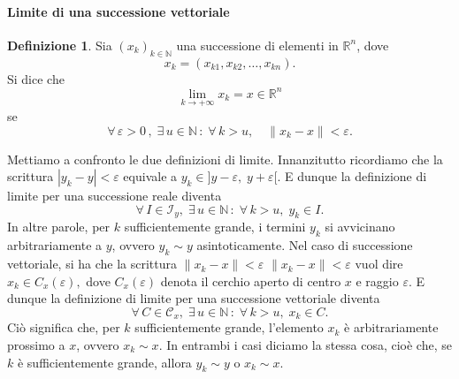 \documentclass{article}
\theoremstyle{plain}
\theoremstyle{definition}
\newtheorem{defn}{Definizione}[section]
\theoremstyle{remark}
\begin{document}
\vspace{10pt}

\paragraph{Limite di una successione vettoriale}
\begin{bxthm}
\begin{defn}
    Sia $(x_k)_{k\in\mathbb{N}}$ una successione di elementi in $\mathbb{R}^n$, dove 
    \[x_k=(x_{k1}, x_{k2}, \dots, x_{kn}). \]
    Si dice che 
    \[\lim_{k\to+\infty} x_k = x \in \mathbb{R}^n\]
    se
    \[\forall\,\varepsilon>0\,,\; \exists\, u\in\mathbb{N}\,:\;\forall\, k>u,\quad \|x_k-x\|<\varepsilon.\]
\end{defn}
\end{bxthm}

\vspace{10pt}

Mettiamo a confronto le due definizioni di limite. Innanzitutto ricordiamo che la scrittura $|y_k - y| < \varepsilon$ equivale a $y_k \in ] y - \varepsilon,\; y + \varepsilon[$.
E dunque la definizione di limite per una successione reale diventa
\[
\forall\,I\in\mathcal{I}_y,\; \exists\, u\in\mathbb{N}\,:\; \forall\, k>u,\; y_k\in I.
\]
In altre parole, per $k$ sufficientemente grande, i termini $y_k$ si avvicinano arbitrariamente a $y$, ovvero $y_k \sim y$ asintoticamente.
Nel caso di successione vettoriale, si ha che la scrittura $\| x_k - x \| < \varepsilon$  $\| x_k - x \| < \varepsilon$ vuol dire $x_k \in C_{x}(\varepsilon),$
dove $C_{x}(\varepsilon)$ denota il cerchio aperto di centro $x$ e raggio $\varepsilon$. E dunque la definizione di limite per una successione vettoriale diventa
\[
\forall\, C\in\mathcal{C}_x,\; \exists\, u\in\mathbb{N}\,:\; \forall\, k>u,\; x_k\in C.
\]
Ciò significa che, per $k$ sufficientemente grande, l'elemento $x_k$ è arbitrariamente prossimo a $x$, ovvero $x_k \sim x$.
In entrambi i casi diciamo la stessa cosa, cioè che, se $k$ è sufficientemente grande, allora $y_k \sim y$ o $x_k \sim x$.

\vspace{10pt}
\end{document}
